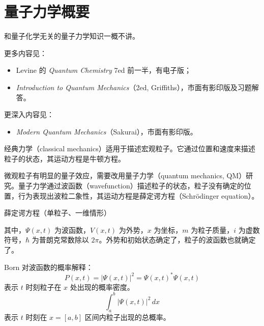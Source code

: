 \section{量子力学概要}

和量子化学无关的量子力学知识一概不讲。

更多内容见：
\begin{itemize}
  \item Levine 的 \textit{Quantum Chemistry} 7ed 前一半，有电子版；
  \item \textit{Introduction to Quantum Mechanics}（2ed, Griffiths），市面有影印版及习题解答。
\end{itemize}

更深入内容见：
\begin{itemize}
  \item \textit{Modern Quantum Mechanics}（Sakurai），市面有影印版。
\end{itemize}

经典力学（classical mechanics）适用于描述宏观粒子。它通过位置和速度来描述粒子的状态，其运动方程是牛顿方程。

微观粒子有明显的量子效应，需要改用量子力学（quantum mechanics, QM）研究。量子力学通过波函数（wavefunction）描述粒子的状态，粒子没有确定的位置，行为表现出波粒二象性，其运动方程是薛定谔方程（Schr\"odinger equation）。

\begin{center}
\end{center}

薛定谔方程（单粒子、一维情形）

\begin{center}
\setlength{\fboxsep}{10pt}
\end{center}

其中，$\Psi(x,t)$ 为波函数，$V(x,t)$ 为外势，$x$ 为坐标，$m$ 为粒子质量，$i$ 为虚数符号，$\hbar$ 为普朗克常数除以 $2\pi$。外势和初始状态确定了，粒子的波函数也就确定了。

Born 对波函数的概率解释：
\[
P(x,t)=|\Psi(x,t)|^2=\Psi(x,t)^*\Psi(x,t)
\]
表示 $t$ 时刻粒子在 $x$ 处出现的概率密度。
\[
\int_a^b |\Psi(x,t)|^2\,dx
\]
表示 $t$ 时刻在 $x=[a,b]$ 区间内粒子出现的总概率。

